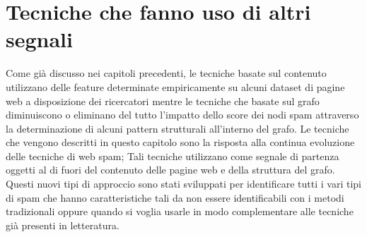 \chapter{Tecniche che fanno uso di altri segnali}
 Come già discusso nei capitoli precedenti, le tecniche basate sul contenuto utilizzano delle feature determinate empiricamente su alcuni dataset di pagine web a disposizione dei ricercatori mentre le tecniche che basate sul grafo diminuiscono o eliminano del tutto l'impatto dello score dei nodi spam attraverso la determinazione di alcuni pattern strutturali all'interno del grafo.  Le tecniche che vengono descritti in questo capitolo sono la risposta alla continua evoluzione delle tecniche di web spam; Tali tecniche utilizzano come segnale di partenza oggetti al di fuori del contenuto delle pagine web e della struttura del grafo. Questi nuovi tipi di approccio sono stati sviluppati per identificare tutti i vari tipi di spam che hanno caratteristiche tali da non essere identificabili con i metodi tradizionali oppure quando si voglia usarle in modo complementare alle tecniche già presenti in letteratura. 


